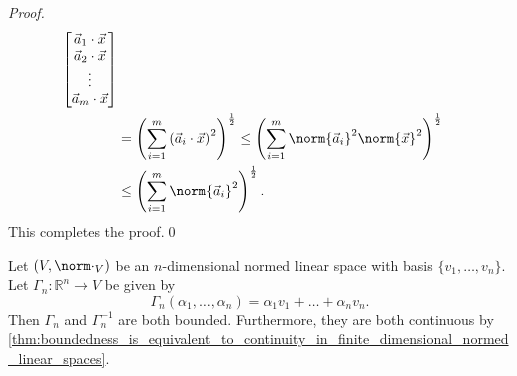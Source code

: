 \documentclass[notoc,notitlepage]{tufte-book}
\begin{document}
\begin{proof}
\begin{align*}
{\begin{bmatrix}
                          \vec{a}_1 \cdot \vec{x} \\
                          \vec{a}_2 \cdot \vec{x} \\
                          \vdots \\
                          \vec{a}_m \cdot \vec{x}
                      \end{bmatrix} } \\
                  &= \left( \sum_{i=1}^{m} \left( \vec{a}_i \cdot \vec{x} \right)^2 \right)^\frac{1}{2} \leq \left( \sum_{i=1}^{m} \norm{\vec{a}_i}^2 \norm{\vec{x}}^2 \right)^\frac{1}{2} \\
                  &\leq \left( \sum_{i=1}^{m} \norm{ \vec{a}_i }^2 \right)^\frac{1}{2}.
  \end{align*}
  This completes the proof.\qed\
\end{proof}

\begin{thm}\label{thm:boundedness_of_functions_between_n_dimensional_vector_spaces_and_n_dimensional_normed_linear_spaces}
  Let $(V, \norm\cdot_V)$ be an $n$-dimensional normed linear space with basis $\{ v_1, \ldots, v_n \}$. Let $\Gamma_n : \mathbb{R}^n \to V$ be given by
  \begin{equation*}
    \Gamma_n(\alpha_1, \ldots, \alpha_n) = \alpha_1 v_1 + \hdots + \alpha_n v_n.
  \end{equation*}
  Then $\Gamma_n$ and $\Gamma_n^{-1}$ are both bounded. Furthermore, they are both continuous by \cref{thm:boundedness_is_equivalent_to_continuity_in_finite_dimensional_normed_linear_spaces}.
\end{thm}
\end{document}
